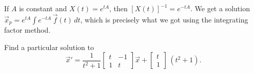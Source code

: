 If $A$ is constant and $X(t) = e^{tA}$, then
$\left[X(t)\right]^{-1} = e^{-tA}$.  
We get a solution
$\vec{x}_p = 
e^{tA}
\int e^{-tA}\,\vec{f}(t) \, dt$,
which is precisely what we got using the integrating factor method.

\begin{example}
Find a particular solution to
\begin{equation} \label{nhsys:vcexeq}
{\vec{x}}'
=
\frac{1}{t^2+1}
\begin{bmatrix}
t & -1 \\
1 & t
\end{bmatrix}
\vec{x}
+ \begin{bmatrix} t \\ 1 \end{bmatrix} \,(t^2+1) .
\end{equation}


\end{example}

